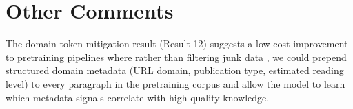 \documentclass{article}
\begin{document}
\section{Other Comments}

\begin{itemize}[leftmargin=*]


  The domain-token mitigation result (Result 12) suggests a low-cost improvement to pretraining pipelines where rather than filtering junk data \cite{gunasekar2023textbooks}, we could prepend structured domain metadata (URL domain, publication type, estimated reading level) to every paragraph in the pretraining corpus and allow the model to learn which metadata signals correlate with high-quality knowledge. 



\end{itemize}
\end{document}
